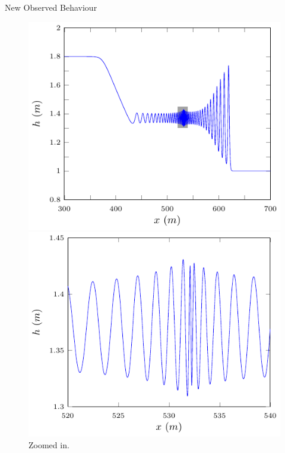 \documentclass[pdf]{beamer}
\begin{document}
\begin{frame}{New Observed Behaviour}
	
	\begin{figure}
		\centering
		\begin{minipage}{.5\textwidth}
			\centering
			\includegraphics[width=1\linewidth]{./Pictures/DSW/DSWN.pdf}
			\caption{New observed structure.}
		\end{minipage}%
		\pause
		\begin{minipage}{.5\textwidth}
			\centering
			\includegraphics[width=1\linewidth]{./Pictures/DSW/DSWNz.pdf}
			\caption{Zoomed in.}
		\end{minipage}
	\end{figure}
\end{frame}
\end{document}
